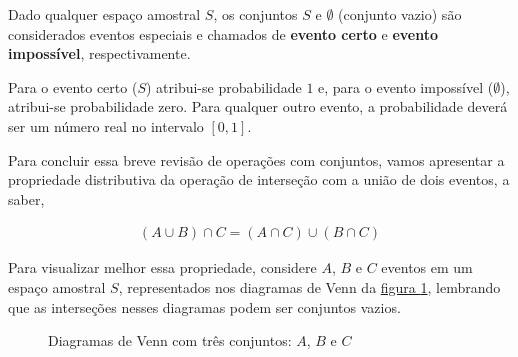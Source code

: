 Dado qualquer espaço amostral \(S\), os conjuntos \(S\) e \(\emptyset\) (conjunto vazio) são considerados eventos especiais e chamados de \textbf{evento certo} e \textbf{evento impossível}, respectivamente.

Para o evento certo (\(S\)) atribui-se probabilidade $1$ e, para o evento impossível (\(\emptyset\)), atribui-se probabilidade zero. Para qualquer outro evento, a probabilidade deverá ser um número real no intervalo $[0,1]$.

Para concluir essa breve revisão de operações com conjuntos, vamos apresentar a propriedade distributiva da operação de interseção com a união de dois eventos, a saber,

\begin{equation*}
\begin{split}(A\cup B)\cap C=(A\cap C)\cup (B\cap C)\end{split}
\end{equation*}

Para visualizar melhor essa propriedade, considere $A$, $B$ e $C$ eventos em um espaço amostral $S$, representados nos diagramas de Venn da \hyperref[diagramasvenn2]{figura \ref{diagramasvenn2}}, lembrando que as interseções nesses diagramas podem ser conjuntos vazios.

\begin{figure}[H]
\centering
\begin{minipage}{0.35\textwidth}
\centering
{}

\end{minipage}
\begin{minipage}{0.35\textwidth}
\centering
{}

\end{minipage}
\caption{Diagramas de Venn com três conjuntos: \(A\), \(B\)  e \(C\)}
\label{diagramasvenn2}
\end{figure}



